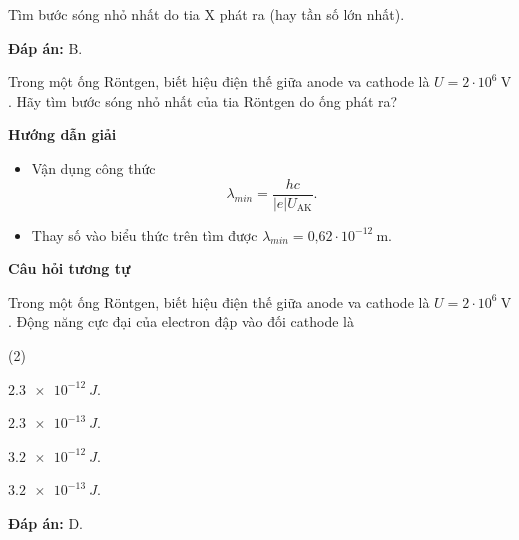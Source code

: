 \begin{dang}{Tìm bước sóng nhỏ nhất do tia X phát ra (hay tần số lớn nhất).}
{		\textbf{Đáp án:} B.
		
	}
	{
		Trong một ống R\"ontgen, biết hiệu điện thế giữa anode va cathode là $U = 2\cdot 10^6\ \text{V}$.  Hãy tìm bước sóng nhỏ nhất của tia R\"ontgen do ống phát ra?
	}
	{\begin{center}
			\textbf{Hướng dẫn giải}
		\end{center}
		\begin{itemize}
			\item Vận dụng công thức 
			\begin{equation*}
				\lambda_{min}= \dfrac{hc}{	|e|U_{\text{AK}}}.
			\end{equation*}
			\item Thay số vào biểu thức trên tìm được $\lambda_{min}=\text{0,62} \cdot 10^{-12}\ \text{m}$.
		\end{itemize}
		
		\begin{center}
			\textbf{Câu hỏi tương tự}
		\end{center}
		
		Trong một ống R\"ontgen, biết hiệu điện thế giữa anode va cathode là $U = 2\cdot 10^6\ \text{V}$. Động năng cực đại của electron đập vào đối cathode là 
		\begin{mcq}(2)
			\item $ \SI{2,3 e-12}{J} $.
			\item $ \SI{2,3 e-13}{J} $.
			\item $ \SI{3,2 e-12}{J} $.
			\item $ \SI{3,2 e-13}{J} $.
		\end{mcq}
		
		\textbf{Đáp án:} D.
		
	}
	
\end{dang}


